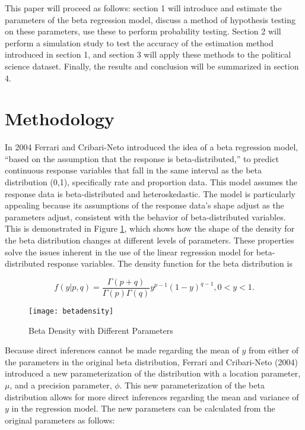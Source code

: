 \documentclass{svproc}
\begin{document}
This paper will proceed as follows: section 1 will introduce and estimate the parameters of the beta regression model, discuss a method of hypothesis testing on these parameters, use these to perform probability testing. Section 2 will perform a simulation study to test the accuracy of the estimation method introduced in section 1, and section 3 will apply these methods to the political science dataset. Finally, the results and conclusion will be summarized in section 4.

\section{Methodology}

In 2004 Ferrari and Cribari-Neto introduced the idea of a beta regression model, \enquote{based on the assumption that the response is beta-distributed,} to predict continuous response variables that fall in the same interval as the beta distribution (0,1), specifically rate and proportion data. This model assumes the response data is beta-distributed and heteroskedastic. The model is particularly appealing because its assumptions of the response data's shape adjust as the parameters adjust, consistent with the behavior of beta-distributed variables. This is demonstrated in Figure \ref{betadensity}, which shows how the shape of the density for the beta distribution changes at different levels of parameters. These properties solve the issues inherent in the use of the linear regression model for beta-distributed response variables. The density function for the beta distribution is 

\begin{equation}
f(y|p, q) = \frac{\Gamma (p + q)}{\Gamma (p) \Gamma (q)}y^{p - 1}(1-y)^{q-1}, 0<y<1 .
\end{equation}

\begin{figure}
\begin{center}
\caption{Beta Density with Different Parameters}
\texttt{[image: betadensity]}
\label{betadensity}
\smallskip
\end{center}
\end{figure}

Because direct inferences cannot be made regarding the mean of $y$ from either of the parameters in the original beta distribution, Ferrari and Cribari-Neto (2004) introduced a new parameterization of the distribution with a location parameter, $\mu$, and a precision parameter, $\phi$. This new parameterization of the beta distribution allows for more direct inferences regarding the mean and variance of $y$ in the regression model. The new parameters can be calculated from the original parameters as follows:
\end{document}
